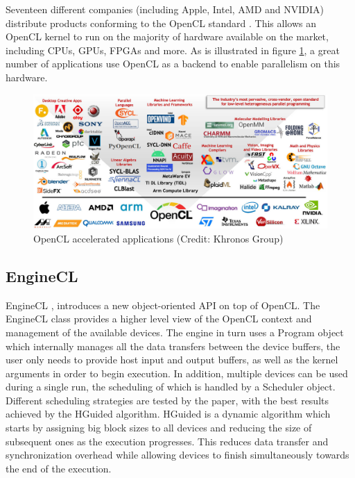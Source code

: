 Seventeen different companies (including Apple, Intel, AMD and NVIDIA) distribute products conforming to the OpenCL standard \cite{opencl_conformant_companies}. This allows an OpenCL kernel to run on the majority of hardware available on the market, including CPUs, GPUs, FPGAs and more. As is illustrated in figure \ref{fig:opencl_accelerated_apps}, a great number of applications use OpenCL as a backend to enable parallelism on this hardware.

\begin{figure}[ht]
    \centering
    \includegraphics[width=\textwidth]{img/opencl-accelerated-apps.png}
    \captionsetup{justification=centering}
    \caption{OpenCL accelerated applications (Credit: Khronos Group)}
    \label{fig:opencl_accelerated_apps}
\end{figure}

\subsection{EngineCL}
EngineCL \cite{enginecl}, introduces a new object-oriented API on top of OpenCL. The EngineCL class provides a higher level view of the OpenCL context and management of the available devices. The engine in turn uses a Program object which internally manages all the data transfers between the device buffers, the user only needs to provide host input and output buffers, as well as the kernel arguments in order to begin execution. In addition, multiple devices can be used during a single run, the scheduling of which is handled by a Scheduler object. Different scheduling strategies are tested by the paper, with the best results achieved by the HGuided algorithm. HGuided is a dynamic algorithm which starts by assigning big block sizes to all devices and reducing the size of subsequent ones as the execution progresses. This reduces data transfer and synchronization overhead while allowing devices to finish simultaneously towards the end of the execution.

